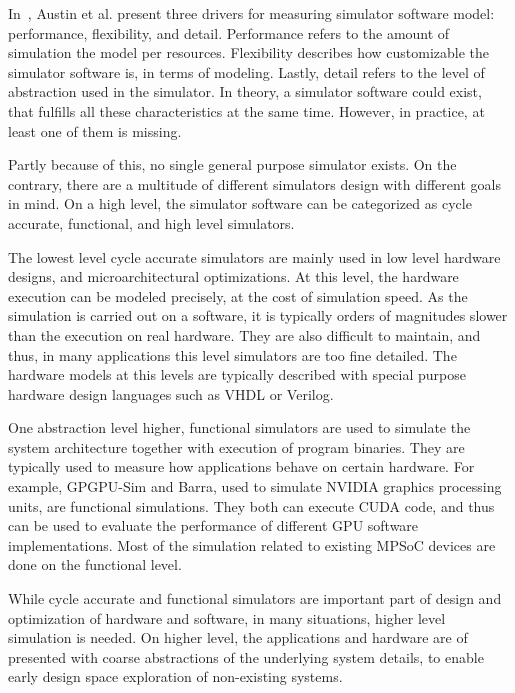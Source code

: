 In~\cite{Austin:2002:SimpleScalar}, Austin et al. present three drivers for measuring simulator software model: performance, flexibility, and detail. Performance refers to the amount of simulation the model per resources. Flexibility describes how customizable the simulator software is, in terms of modeling. Lastly, detail refers to the level of abstraction used in the simulator. In theory, a simulator software could exist, that fulfills all these characteristics at the same time. However, in practice, at least one of them is missing.~\cite{Austin:2002:SimpleScalar}

Partly because of this, no single general purpose simulator exists. On the contrary, there are a multitude of different simulators design with different goals in mind. On a high level, the simulator software can be categorized as cycle accurate, functional, and high level simulators.

The lowest level cycle accurate simulators are mainly used in low level hardware designs, and microarchitectural optimizations. At this level, the hardware execution can be modeled precisely, at the cost of simulation speed. As the simulation is carried out on a software, it is typically orders of magnitudes slower than the execution on real hardware. They are also difficult to maintain, and thus, in many applications this level simulators are too fine detailed. The hardware models at this levels are typically described with special purpose hardware design languages such as VHDL or Verilog.~\cite{Patterson:2007:Computer, Weaver:2008:Cycle}

One abstraction level higher, functional simulators are used to simulate the system architecture together with execution of program binaries. They are typically used to measure how applications behave on certain hardware. For example, GPGPU-Sim and Barra, used to simulate NVIDIA graphics processing units, are functional simulations. They both can execute CUDA code, and thus can be used to evaluate the performance of different GPU software implementations. Most of the simulation related to existing MPSoC devices are done on the functional level.~\cite{Lopez:2015:GPGPUSIM}

While cycle accurate and functional simulators are important part of design and optimization of hardware and software, in many situations, higher level simulation is needed. On higher level, the applications and hardware are of presented with coarse abstractions of the underlying system details, to enable early design space exploration of non-existing systems.

